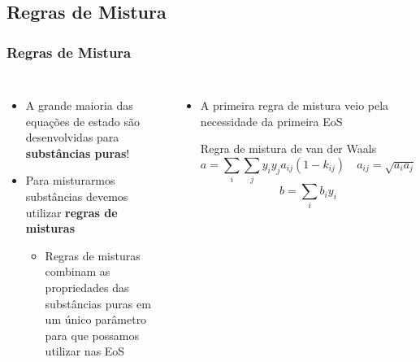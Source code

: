 \documentclass[aspectratio=169]{beamer}
\begin{document}
\subsection*{Regras de Mistura}

\begin{frame}
	\frametitle{Regras de Mistura}
	\begin{columns}[c]
		\begin{itemize}
			\item A grande maioria das equações de estado são desenvolvidas para
			\textbf{substâncias puras}!
			\item Para misturarmos substâncias devemos utilizar \textbf{regras de
			misturas}
			\pause
			\begin{itemize}
				\item Regras de misturas combinam as propriedades das substâncias puras em
				um único parâmetro para que possamos utilizar nas EoS	
			\end{itemize}
		\end{itemize}
		\pause
		\begin{itemize}
			\item A primeira regra de mistura veio pela necessidade da primeira EoS
			\begin{block}{Regra de mistura de van der Waals}
			\begin{equation*}
			a = \sum_i\sum_j{y_iy_ja_{ij}}(1-k_{ij}) \quad a_{ij}= \sqrt{a_i a_j}
			\end{equation*}
			\begin{equation*}
			b = \sum_i{b_iy_i}
			\end{equation*}
			\end{block}
		\end{itemize}
	\end{columns}
	
\end{frame}
\end{document}
